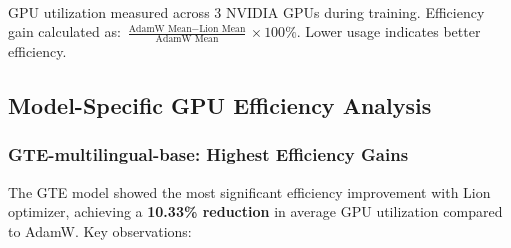 \begin{table}[htbp]
\centering
\caption{GPU Usage Statistics Comparison: Lion vs AdamW Optimizers}
\label{tab:gpu_usage}
\vspace{1em}\\
\footnotesize{GPU utilization measured across 3 NVIDIA GPUs during training. Efficiency gain calculated as: $\frac{\text{AdamW Mean} - \text{Lion Mean}}{\text{AdamW Mean}} \times 100\%$. Lower usage indicates better efficiency.}
\end{table}

\subsection{Model-Specific GPU Efficiency Analysis}

\subsubsection{GTE-multilingual-base: Highest Efficiency Gains}

The GTE model showed the most significant efficiency improvement with Lion optimizer, achieving a \textbf{10.33\% reduction} in average GPU utilization compared to AdamW. Key observations:

